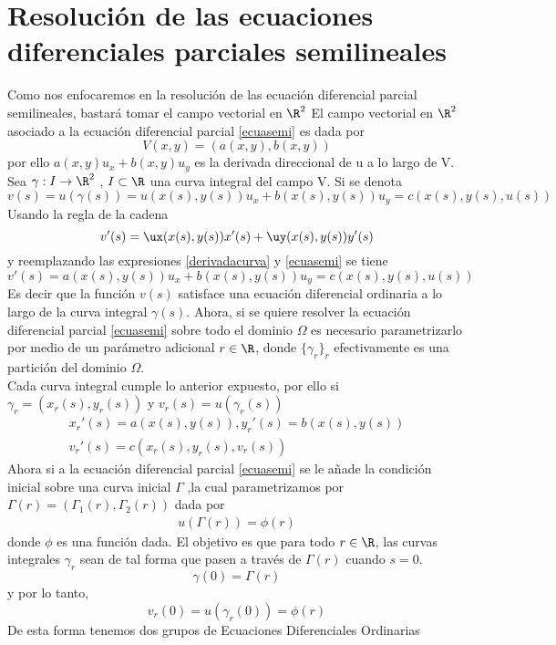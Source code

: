 \section{Resolución de las ecuaciones diferenciales parciales semilineales}
Como nos enfocaremos en la resolución de las ecuación diferencial parcial semilineales, bastará tomar el campo vectorial en $\R^2$
El campo vectorial en $\R^2$ asociado a la ecuación diferencial parcial \ref{ecuasemi} es dada por 
$$V(x,y)=(a(x,y),b(x,y))$$
por ello $a(x,y)u_x+b(x,y)u_y$ es la derivada direccional de u a lo largo de V.\\
Sea  $\gamma:I\rightarrow\R^2$ , $I\subset\R$ una curva integral del campo V.
Si se denota $v(s)=u(\gamma(s))=u(x(s),y(s))u_x+b(x(s),y(s))u_y=c(x(s),y(s),u(s))$
Usando la regla de la cadena $$v'(s)=\ux(x(s),y(s))x'(s)+\uy(x(s),y(s))y'(s)$$ y reemplazando las expresiones \ref{derivadacurva} y \ref{ecuasemi} se tiene $$v'(s)=a(x(s),y(s))u_x+b(x(s),y(s))u_y=c(x(s),y(s),u(s))$$
Es decir que la función $v(s)$ satisface una ecuación diferencial ordinaria a lo largo de la curva integral $\gamma(s)$.
Ahora, si se quiere resolver la ecuación diferencial parcial \ref{ecuasemi} sobre todo el dominio $\Omega$ es necesario parametrizarlo por medio de un parámetro adicional $r\in\R$, donde $\{\gamma_r\}_r$ efectivamente es una partición del dominio $\Omega$. \\
Cada curva integral cumple lo anterior expuesto, por ello si $\gamma_r=(x_r(s),y_r(s))$ y $v_r(s)=u(\gamma_r(s))$
\begin{eqnarray*}
x_r'(s)=a(x(s),y(s)), y_r'(s)=b(x(s),y(s))\label{derivadacurvar}\\
v_r'(s)=c(x_r(s),y_r(s),v_r(s))
\end{eqnarray*}
Ahora si a la ecuación diferencial parcial \ref{ecuasemi} se le añade la condición inicial sobre una curva inicial $\Gamma$ ,la cual parametrizamos por $\Gamma(r)=(\Gamma_1(r),\Gamma_2(r))$ dada por
\begin{eqnarray}
u(\Gamma(r))=\phi(r) \label{condinicial}
\end{eqnarray}
donde $\phi$ es una función dada.
El objetivo es que para todo $r\in\R$, las curvas integrales $\gamma_r$  sean de tal forma que pasen a través de $\Gamma(r)$ cuando $s=0$.
$$\gamma(0)=\Gamma(r)$$
y por lo tanto,
$$v_r(0)=u(\gamma_r(0))=\phi(r)$$
De esta forma tenemos dos grupos de Ecuaciones Diferenciales Ordinarias
